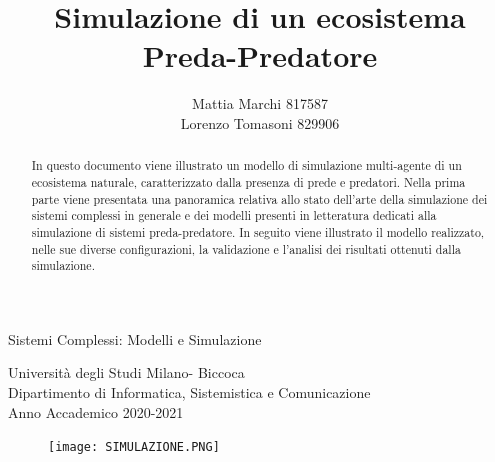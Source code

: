 \documentclass[11pt]{article}
\begin{document}
\title{Simulazione di un ecosistema Preda-Predatore}

\author{Mattia Marchi 817587 \\
Lorenzo Tomasoni 829906 }

\date{}

\maketitle

\vspace{5cm}

\begin{center}
\Large{Sistemi Complessi: Modelli e Simulazione}

\vspace{4cm}

\large{Università degli Studi Milano- Biccoca \\
Dipartimento di Informatica, Sistemistica e Comunicazione \\
Anno Accademico 2020-2021}
\end{center}

\newpage

\begin{abstract}
    In questo documento viene illustrato un modello di simulazione multi-agente di un ecosistema naturale, caratterizzato dalla presenza di prede e predatori. Nella prima parte viene presentata una panoramica relativa allo stato dell'arte della simulazione dei sistemi complessi in generale e dei modelli presenti in letteratura dedicati alla simulazione di sistemi preda-predatore. In seguito viene illustrato il modello realizzato, nelle sue diverse configurazioni, la validazione e l'analisi dei risultati ottenuti dalla simulazione. 
    
    \vspace{3cm}
    
\end{abstract}

\vspace{1.5cm}

\begin{figure}[h]
    \hspace{-1.9cm}
    \texttt{[image: SIMULAZIONE.PNG]}
\end{figure}




\newpage
\end{document}

